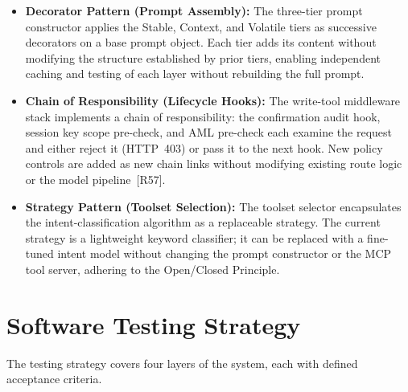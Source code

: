 \documentclass[12pt,a4paper]{report}
\begin{document}
\begin{itemize}[noitemsep]
\item \textbf{Decorator Pattern (Prompt Assembly):} The three-tier prompt
constructor applies the Stable, Context, and Volatile tiers as successive
decorators on a base prompt object. Each tier adds its content without modifying
the structure established by prior tiers, enabling independent caching and testing
of each layer without rebuilding the full prompt.

\item \textbf{Chain of Responsibility (Lifecycle Hooks):} The write-tool middleware
stack implements a chain of responsibility: the confirmation audit hook, session
key scope pre-check, and AML pre-check each examine the request and either reject
it (HTTP~403) or pass it to the next hook. New policy controls are added as new
chain links without modifying existing route logic or the model
pipeline~[R57].

\item \textbf{Strategy Pattern (Toolset Selection):} The toolset selector
encapsulates the intent-classification algorithm as a replaceable strategy. The
current strategy is a lightweight keyword classifier; it can be replaced with a
fine-tuned intent model without changing the prompt constructor or the MCP tool
server, adhering to the Open/Closed Principle.
\end{itemize}


\section{Software Testing Strategy}

The testing strategy covers four layers of the system, each with defined acceptance criteria.
\end{document}
